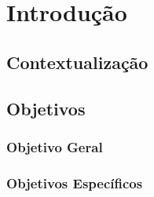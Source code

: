 \chapter{Introdução}


\section{Contextualização}


\section{Objetivos}

\subsection{Objetivo Geral}

\subsection{Objetivos Específicos}
